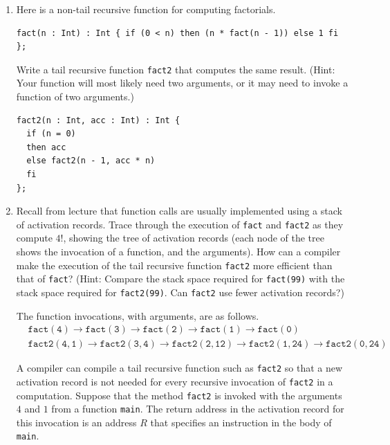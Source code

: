 \documentclass[11pt]{article}
\begin{document}
\begin{enumerate}
\begin{enumerate}
\item Here is a non-tail recursive function for computing factorials.
\begin{verbatim}
fact(n : Int) : Int { if (0 < n) then (n * fact(n - 1)) else 1 fi };
\end{verbatim}
Write a tail recursive function \texttt{fact2} that computes the same
result.  (Hint: Your function will most likely need two arguments, or
it may need to invoke a function of two arguments.)
\begin{verbatim}
fact2(n : Int, acc : Int) : Int {
  if (n = 0)
  then acc
  else fact2(n - 1, acc * n)
  fi
};
\end{verbatim}

\item Recall from lecture that function calls are usually implemented
using a stack of activation records.  Trace through the execution of
\texttt{fact} and \texttt{fact2} as they compute $4!$, showing the
tree of activation records (each node of the tree shows the invocation
of a function, and the arguments).  How can a compiler make the
execution of the tail recursive function \texttt{fact2} more efficient
than that of \texttt{fact}?  (Hint: Compare the stack space required
for \texttt{fact(99)} with the stack space required for
\texttt{fact2(99)}.  Can \texttt{fact2} use fewer activation records?)

The function invocations, with arguments, are as follows.
\begin{align*}
& \mathtt{fact(4)} \rightarrow \mathtt{fact(3)} \rightarrow
\mathtt{fact(2)} \rightarrow \mathtt{fact(1)} \rightarrow
\mathtt{fact(0)} \\
& \mathtt{fact2(4, 1)} \rightarrow \mathtt{fact2(3, 4)} \rightarrow
\mathtt{fact2(2, 12)} \rightarrow \mathtt{fact2(1, 24)} \rightarrow
\mathtt{fact2(0, 24)}
\end{align*}

A compiler can compile a tail recursive function such as
\texttt{fact2} so that a new activation record is not needed for every
recursive invocation of \texttt{fact2} in a computation.  Suppose that
the method \texttt{fact2} is invoked with the arguments $4$ and $1$
from a function \texttt{main}.  The return address in the activation
record for this invocation is an address $R$ that specifies an
instruction in the body of \texttt{main}.


\end{enumerate}
\end{enumerate}
\end{document}
